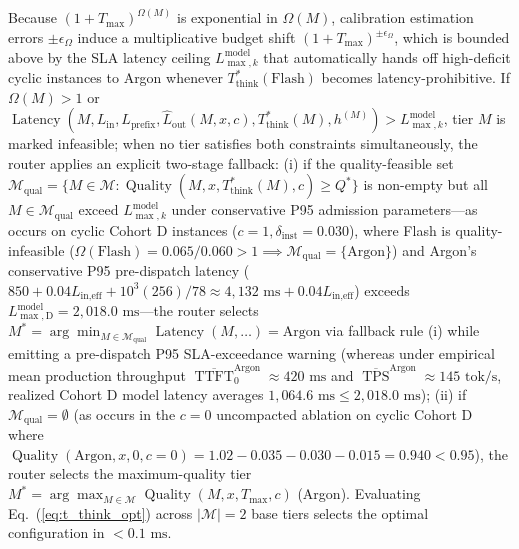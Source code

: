 \documentclass[conference,10pt]{IEEEtran}
\begin{document}
Because $(1 + T_{\max})^{\Omega(M)}$ is exponential in $\Omega(M)$, calibration estimation errors $\pm \epsilon_{\Omega}$ induce a multiplicative budget shift $(1 + T_{\max})^{\pm \epsilon_{\Omega}}$, which is bounded above by the SLA latency ceiling $L_{\max,k}^{\text{model}}$ that automatically hands off high-deficit cyclic instances to Argon whenever $T_{\text{think}}^*(\text{Flash})$ becomes latency-prohibitive. If $\Omega(M) > 1$ or $\operatorname{Latency}(M, L_{\text{in}}, L_{\text{prefix}}, \hat{L}_{\text{out}}(M, x, c), T_{\text{think}}^*(M), h^{(M)}) > L_{\max,k}^{\text{model}}$, tier $M$ is marked infeasible; when no tier satisfies both constraints simultaneously, the router applies an explicit two-stage fallback: (i) if the quality-feasible set $\mathcal{M}_{\text{qual}} = \{M \in \mathcal{M} : \operatorname{Quality}(M, x, T_{\text{think}}^*(M), c) \ge Q^*\}$ is non-empty but all $M \in \mathcal{M}_{\text{qual}}$ exceed $L_{\max,k}^{\text{model}}$ under conservative P95 admission parameters---as occurs on cyclic Cohort D instances ($c=1, \delta_{\text{inst}}=0.030$), where Flash is quality-infeasible ($\Omega(\text{Flash}) = 0.065/0.060 > 1 \implies \mathcal{M}_{\text{qual}} = \{\text{Argon}\}$) and Argon's conservative P95 pre-dispatch latency ($850 + 0.04 L_{\text{in,eff}} + 10^3(256)/78 \approx 4{,}132\text{ ms} + 0.04 L_{\text{in,eff}}$) exceeds $L_{\max,\text{D}}^{\text{model}} = 2{,}018.0\text{ ms}$---the router selects $M^* = \arg\min_{M \in \mathcal{M}_{\text{qual}}} \operatorname{Latency}(M, \dots) = \text{Argon}$ via fallback rule (i) while emitting a pre-dispatch P95 SLA-exceedance warning (whereas under empirical mean production throughput $\overline{\operatorname{TTFT}}_0^{\text{Argon}} \approx 420\text{ ms}$ and $\overline{\operatorname{TPS}}^{\text{Argon}} \approx 145\text{ tok/s}$, realized Cohort D model latency averages $1{,}064.6\text{ ms} \le 2{,}018.0\text{ ms}$); (ii) if $\mathcal{M}_{\text{qual}} = \emptyset$ (as occurs in the $c=0$ uncompacted ablation on cyclic Cohort D where $\operatorname{Quality}(\text{Argon}, x, 0, c=0) = 1.02 - 0.035 - 0.030 - 0.015 = 0.940 < 0.95$), the router selects the maximum-quality tier $M^* = \arg\max_{M \in \mathcal{M}} \operatorname{Quality}(M, x, T_{\max}, c)$ (Argon). Evaluating Eq.~(\ref{eq:t_think_opt}) across $|\mathcal{M}| = 2$ base tiers selects the optimal configuration in $< 0.1\text{ ms}$.
\end{document}
